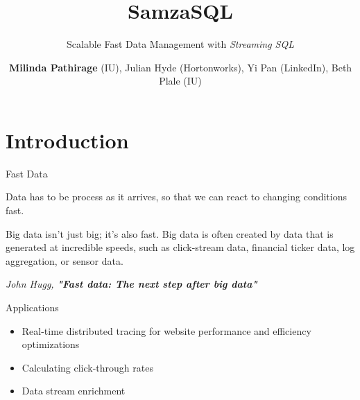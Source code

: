 \documentclass[newPxFont]{beamer}
\title{SamzaSQL}
\subtitle{Scalable Fast Data Management with \textit{Streaming SQL}}
\author{\textbf{Milinda Pathirage} (IU), Julian Hyde (Hortonworks), Yi Pan (LinkedIn), Beth Plale (IU)}
\institute{School of Informatics and Computing, Indiana University}
\begin{document}

%
%

\maketitle


%
%

\section*{Introduction}


\begin{frame}[c]{Fast Data}

Data has to be process as it arrives, so that we can react to changing conditions fast. 

\vspace{1em}

\begin{exampleblock}{Big data isn't just big; it's also fast.}
Big data is often created by data that is generated at incredible speeds, such as click-stream data, financial ticker data, log aggregation, or sensor data. 
\end{exampleblock}
\vspace{-1.5em}
\begin{flushright}
\tiny\textit{John Hugg, \textbf{"Fast data: The next step after big data"}}
\end{flushright}

\end{frame}



\begin{frame}[c]{Applications}

\begin{itemize}
	\item Real-time distributed tracing for website performance and efficiency optimizations
	\item Calculating click-through rates
	\item Data stream enrichment
\end{itemize}

\end{frame}
\end{document}
